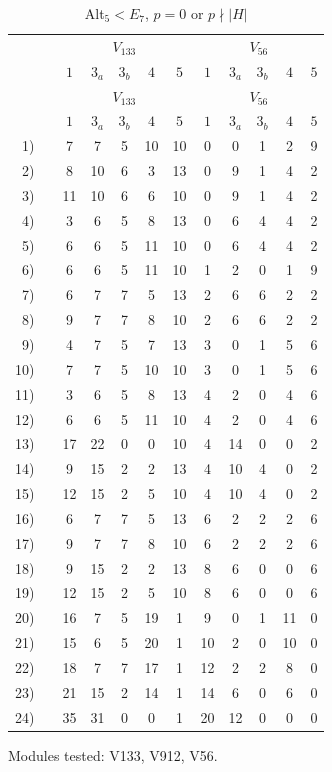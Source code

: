 \setcounter{table}{135}
\begin{longtable}{rc|ccccc|ccccc}
\caption{Alt$_{5} < E_7$, $p = 0$ or $p \nmid |H|$}\\
& & \multicolumn{5}{c|}{$V_{133}$} & \multicolumn{5}{c}{$V_{56}$} \\
& & $1$ & $3_{a}$ & $3_{b}$ & $4$ & $5$ & $1$ & $3_{a}$ & $3_{b}$ & $4$ & $5$ \\ \hline
\endfirsthead
& & \multicolumn{5}{c|}{$V_{133}$} & \multicolumn{5}{c}{$V_{56}$} \\
& & $1$ & $3_{a}$ & $3_{b}$ & $4$ & $5$ & $1$ & $3_{a}$ & $3_{b}$ & $4$ & $5$ \\ \hline
\endhead
1) &  & 7 & 7 & 5 & 10 & 10 & 0 & 0 & 1 & 2 & 9 \\
2) &  & 8 & 10 & 6 & 3 & 13 & 0 & 9 & 1 & 4 & 2 \\
3) &  & 11 & 10 & 6 & 6 & 10 & 0 & 9 & 1 & 4 & 2 \\
4) &  & 3 & 6 & 5 & 8 & 13 & 0 & 6 & 4 & 4 & 2 \\
5) &  & 6 & 6 & 5 & 11 & 10 & 0 & 6 & 4 & 4 & 2 \\
6) &  & 6 & 6 & 5 & 11 & 10 & 1 & 2 & 0 & 1 & 9 \\
7) &  & 6 & 7 & 7 & 5 & 13 & 2 & 6 & 6 & 2 & 2 \\
8) &  & 9 & 7 & 7 & 8 & 10 & 2 & 6 & 6 & 2 & 2 \\
9) &  & 4 & 7 & 5 & 7 & 13 & 3 & 0 & 1 & 5 & 6 \\
10) &  & 7 & 7 & 5 & 10 & 10 & 3 & 0 & 1 & 5 & 6 \\
11) &  & 3 & 6 & 5 & 8 & 13 & 4 & 2 & 0 & 4 & 6 \\
12) &  & 6 & 6 & 5 & 11 & 10 & 4 & 2 & 0 & 4 & 6 \\
13) &  & 17 & 22 & 0 & 0 & 10 & 4 & 14 & 0 & 0 & 2 \\
14) &  & 9 & 15 & 2 & 2 & 13 & 4 & 10 & 4 & 0 & 2 \\
15) &  & 12 & 15 & 2 & 5 & 10 & 4 & 10 & 4 & 0 & 2 \\
16) &  & 6 & 7 & 7 & 5 & 13 & 6 & 2 & 2 & 2 & 6 \\
17) &  & 9 & 7 & 7 & 8 & 10 & 6 & 2 & 2 & 2 & 6 \\
18) &  & 9 & 15 & 2 & 2 & 13 & 8 & 6 & 0 & 0 & 6 \\
19) &  & 12 & 15 & 2 & 5 & 10 & 8 & 6 & 0 & 0 & 6 \\
20) &  & 16 & 7 & 5 & 19 & 1 & 9 & 0 & 1 & 11 & 0 \\
21) &  & 15 & 6 & 5 & 20 & 1 & 10 & 2 & 0 & 10 & 0 \\
22) &  & 18 & 7 & 7 & 17 & 1 & 12 & 2 & 2 & 8 & 0 \\
23) &  & 21 & 15 & 2 & 14 & 1 & 14 & 6 & 0 & 6 & 0 \\
24) &  & 35 & 31 & 0 & 0 & 1 & 20 & 12 & 0 & 0 & 0 \\
\end{longtable}
\noindent Modules tested: V133, V912, V56.\\


